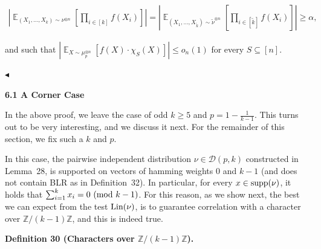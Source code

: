 \begin{enumerate}
\begin{enumerate}
\[\begin{gathered}
\left|\mathop{\mathbb{E}}_{(X_{1},\dots,X_{k})\sim\nu^{\otimes n}}\left[\prod_{i\in[k]}f(X_{i})\right]\right|=\left|\mathop{\mathbb{E}}_{(X_{1},\dots,X_{\tilde{k}})\sim\tilde{\nu}^{\otimes n}}\left[\prod_{i\in[\tilde{k}]}f(X_{i})\right]\right|\geqslant\alpha,
\end{gathered}\]


and such that $\left|\mathop{\mathbb{E}}_{X\sim\mu_{p}^{\otimes n}}\left[f(X)\cdot\chi_{S}(X)\right]\right|\leqslant o_{n}(1)$ for every $S\subseteq[n]$.\par





\end{enumerate}





\end{enumerate}


$\blacktriangleleft$\par





\par\medskip\noindent\textbf{
6.1 A Corner Case}\par




In the above proof, we leave the case of odd $k\geqslant 5$ and $p=1-\frac{1}{k-1}$.
This turns out to be very interesting, and we discuss it next.
For the remainder of this section, we fix such a $k$ and $p$.\par




In this case, the pairwise independent distribution $\nu\in\mathcal{D}(p,k)$ constructed in Lemma 28, is supported on vectors of hamming weights 0 and $k-1$ (and does not contain BLR as in Definition 32).
In particular, for every $x\in\textnormal{supp}(\nu)$, it holds that $\sum_{i=1}^{k}x_{i}=0\textnormal{ (mod $k-1$)}$.
For this reason, as we show next, the best we can expect from the test $\textnormal{Lin}(\nu)$, is to guarantee correlation with a character over $\mathbb{Z}/(k-1)\mathbb{Z}$, and this is indeed true.\par





\par\medskip\noindent\textbf{
\textbf{Definition 30}\textbf{ }(Characters over $\mathbb{Z}/(k-1)\mathbb{Z}$)\textbf{.}
}\par



